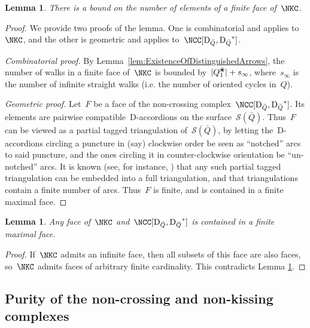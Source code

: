 \documentclass{amsart}
\newtheorem{lemma}[theorem]{Lemma}
\theoremstyle{definition}
\newcommand{\blossom}{^\text{\ding{96}}} %
\newcommand{\surface}{\mathcal{S}} %
\newcommand{\dual}{^*} %
\newcommand{\dissection}{\mathrm{D}} %
\begin{document}
\begin{lemma}
\label{lemm:facesAreBounded}
There is a bound on the number of elements of a finite face of~$\NKC$.
\end{lemma}
\begin{proof}
 We provide two proofs of the lemma.
 One is combinatorial and applies to~$\NKC$, and the other is geometric and applies to~$\NCC[\dissection_{\bar Q}, {\dissection_{\bar Q}}\dual]$.
 
 {\it Combinatorial proof.} By Lemma~\ref{lem:ExistenceOfDistinguishedArrows}, the number of walks in a finite face of~$\NKC$ is bounded by~$|Q_1\blossom|+s_\infty$, where~$s_\infty$ is the number of infinite straight walks (i.e. the number of oriented cycles in~$Q$).

 {\it Geometric proof.} Let~$F$ be a face of the non-crossing complex~$\NCC[\dissection_{\bar Q}, {\dissection_{\bar Q}}\dual]$.
 Its elements are pairwise compatible~$\dissection$-accordions on the surface~$\surface(\bar Q)$.
 Thus~$F$ can be viewed as a partial tagged triangulation of~$\surface(\bar Q)$, by letting the~$\dissection$-accordions circling a puncture in (say) clockwise order be seen as ``notched'' arcs to said puncture, and the ones circling it in counter-clockwise orientation be ``un-notched'' arcs.
 It is known (see, for instance, \cite{FominShapiroThurston}) that any such partial tagged triangulation can be embedded into a full triangulation, and that triangulations contain a finite number of arcs.
 Thus~$F$ is finite, and is contained in a finite maximal face.
\end{proof}




\begin{lemma}
\label{lemm:facetsAreFinite}
Any face of~$\NKC$ and~$\NCC[\dissection_{\bar Q}, {\dissection_{\bar Q}}\dual]$ is contained in a finite maximal face.
\end{lemma}
\begin{proof}
 If~$\NKC$ admits an infinite face, then all subsets of this face are also faces, so~$\NKC$ admits faces of arbitrary finite cardinality.
 This contradicts Lemma \ref{lemm:facesAreBounded}.
\end{proof}



\subsection{Purity of the non-crossing and non-kissing complexes}
\end{document}
